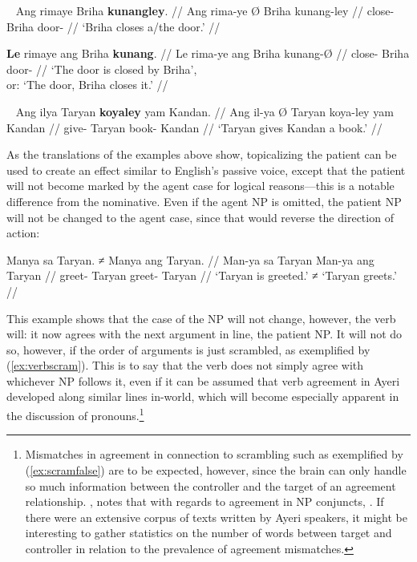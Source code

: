 \xe

\pex~
\a\begingl
	\gla Ang rimaye {} Briha \textbf{kunangley}. //
	\glb Ang rima-ye Ø Briha kunang-ley //
	\glc \AgtT{} close-\TsgF{} \Top{} Briha door-\PargI{} //
	\glft `Briha closes a/the door.' //
\endgl

\a\begingl
	\gla \textbf{Le} rimaye ang Briha \textbf{kunang}. //
	\glb Le rima-ye ang Briha kunang-Ø //
	\glc \PatTI{} close-\TsgF{} \Aarg{} Briha door-\Top{} //
	\glft `The door is closed by Briha',\\
		or: `The door, Briha closes it.' //
\endgl

\xe

\ex~
\begingl
	\gla Ang ilya {} Taryan \textbf{koyaley} yam Kandan. //
	\glb Ang il-ya Ø Taryan koya-ley yam Kandan //
	\glc \AgtT{} give-\TsgM{} \Top{} Taryan book-\PargI{} \Dat{} Kandan //
	\glft `Taryan gives Kandan a book.' //
\endgl

\xe

As the translations of the examples above show, topicalizing the patient can be 
used to create an effect similar to English's passive voice, except that the 
patient will not become marked by the agent case for logical reasons---this is 
a notable difference from the nominative. Even if the agent NP is omitted, the 
patient NP will not be changed to the agent case, since that would reverse the 
direction of action:

\ex\begingl
	\gla Manya sa Taryan. ≠ Manya ang Taryan. //
	\glb Man-ya sa Taryan {} Man-ya ang Taryan //
	\glc greet-\TsgM{} \Parg{} Taryan {} greet-\TsgM{} \Aarg{} Taryan //
	\glft `Taryan is greeted.' ≠ `Taryan greets.' //
\endgl\xe

This example shows that the case of the NP will not change, however, the 
verb will: it now agrees with the next argument in line, the patient NP. It 
will not do so, however, if the order of arguments is just scrambled, as 
exemplified by (\ref{ex:verbscram}). This is to say that the verb does not 
simply agree with whichever NP follows it, even if it can be assumed that verb 
agreement in Ayeri developed along similar lines in-world, which will become 
especially apparent in the discussion of pronouns.\footnote{Mismatches in 
agreement in connection to scrambling such as exemplified by 
(\ref{ex:scramfalse}) are to be expected, however, since the brain can only 
handle so much information between the controller and the target of an 
agreement relationship. \citet{corbett2006}, notes that with regards to 
agreement in NP conjuncts, . If there were an extensive corpus of 
texts written by Ayeri speakers, it might be interesting to gather statistics 
on the number of words between target and controller in relation to the 
prevalence of agreement mismatches.}

